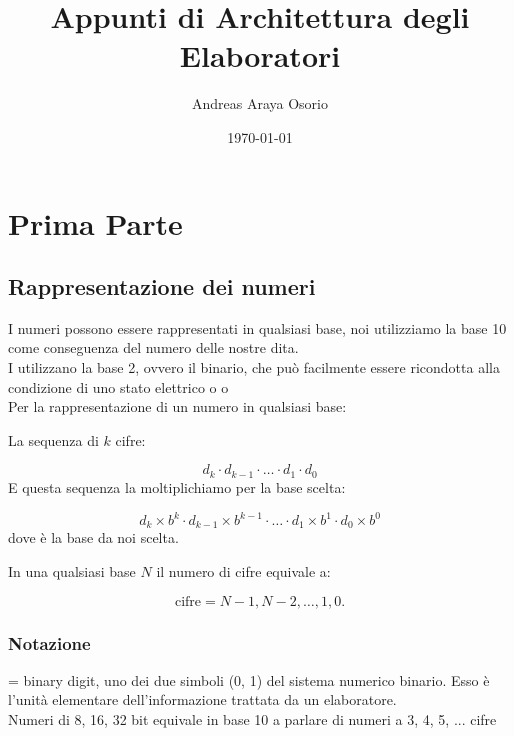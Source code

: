 \documentclass[12pt, a4paper]{report}
\title{Appunti di Architettura degli Elaboratori}
\author{Andreas Araya Osorio}
\date{\today}
\begin{document}
\maketitle

\tableofcontents


\chapter{Prima Parte}

\section{Rappresentazione dei numeri}

I numeri possono essere rappresentati in qualsiasi base, noi utilizziamo la base
10 come conseguenza del numero delle nostre dita.\\
I  utilizzano la base 2, ovvero il binario, che può facilmente
essere ricondotta alla condizione di uno stato elettrico
o  o \\
Per la rappresentazione di un numero in qualsiasi base:
\begin{defn}
La sequenza di $k$ cifre:

\begin{equation}
	d_k \cdot d_{k-1} \cdot \dots \cdot d_1 \cdot d_0
\end{equation}
E questa sequenza la moltiplichiamo per la base scelta:

\begin{equation}
	d_k \times b^k \cdot d_{k-1} \times b^{k-1} \cdot 
	\dots \cdot d_1 \times b^1 \cdot d_0 \times b^0
\end{equation}
dove  è la base da noi scelta.
\end{defn}

\begin{defn}
In una qualsiasi base $N$ il numero di cifre equivale a:


\begin{equation}
	\mbox{cifre} = N - 1, N - 2, \dots, 1, 0.
\end{equation}
\end{defn}

\subsection{Notazione}
\begin{defn}[BIT]
 = binary digit, uno dei due simboli (0, 1) del sistema numerico binario.
Esso è l'unità elementare dell'informazione trattata da un elaboratore.\\
Numeri di 8, 16, 32 bit equivale in base 10 
a parlare di numeri a 3, 4, 5, ... cifre \\
\end{defn}
\end{document}
